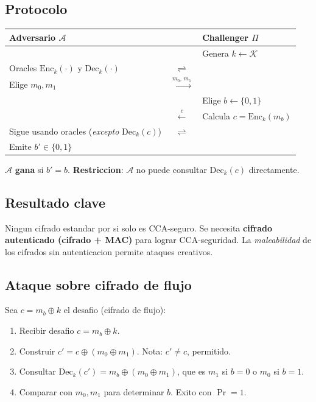 \documentclass[a4paper,11pt]{article}
\begin{document}
\vspace{0.5cm}

\subsection{Protocolo}

\begin{center}
\begin{tabular}{ACB}
\toprule
\textbf{Adversario $\mathcal{A}$} & & \textbf{Challenger $\Pi$} \\
\midrule
 & & Genera $k \leftarrow \mathcal{K}$ \\
Oracles $\mathrm{Enc}_k(\cdot)$ y $\mathrm{Dec}_k(\cdot)$ & $\rightleftharpoons$ & \\
Elige $m_0, m_1$ & $\xrightarrow{m_0,\,m_1}$ & \\
 & & Elige $b \leftarrow \{0,1\}$ \\
 & $\xleftarrow{c}$ & Calcula $c = \mathrm{Enc}_k(m_b)$ \\
Sigue usando oracles (\emph{excepto} $\mathrm{Dec}_k(c)$) & $\rightleftharpoons$ & \\
Emite $b' \in \{0,1\}$ & & \\
\bottomrule
\end{tabular}
\end{center}

\vspace{0.3cm}
$\mathcal{A}$ \textbf{gana} si $b' = b$. \textbf{Restriccion}: $\mathcal{A}$ no puede consultar $\mathrm{Dec}_k(c)$ directamente.

\subsection{Resultado clave}

\begin{insightbox}
Ningun cifrado estandar por si solo es CCA-seguro. Se necesita \textbf{cifrado autenticado (cifrado + MAC)} para lograr CCA-seguridad. La \emph{maleabilidad} de los cifrados sin autenticacion permite ataques creativos.
\end{insightbox}

\subsection{Ataque sobre cifrado de flujo}

\begin{attackbox}
Sea $c = m_b \oplus k$ el desafio (cifrado de flujo):
\begin{enumerate}[leftmargin=*, label=\textbf{\arabic*.}]
  \item Recibir desafio $c = m_b \oplus k$.
  \item Construir $c' = c \oplus (m_0 \oplus m_1)$. Nota: $c' \neq c$, permitido.
  \item Consultar $\mathrm{Dec}_k(c') = m_b \oplus (m_0 \oplus m_1)$, que es $m_1$ si $b=0$ o $m_0$ si $b=1$.
  \item Comparar con $m_0, m_1$ para determinar $b$. Exito con $\Pr = 1$.
\end{enumerate}
\end{attackbox}
\end{document}
